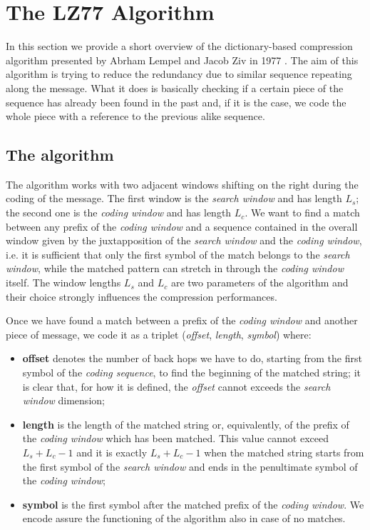 \section{The LZ77 Algorithm} \label{sec:lz77}
In this section we provide a short overview of the dictionary-based compression algorithm presented by Abrham Lempel and Jacob Ziv in 1977 \cite{ziv1}. The aim of this algorithm is trying to reduce the redundancy due to similar sequence repeating along the message. What it does is basically checking if a certain piece of the sequence has already been found in the past and, if it is the case, we code the whole piece with a reference to the previous alike sequence.

\subsection{The algorithm} \label{subsec:lz77alg}
The algorithm works with two adjacent windows shifting on the right during the coding of the message. The first window is the \textit{search window} and has length $L_s$; the second one is the \textit{coding window} and has length $L_c$. We want to find a match between any prefix of the \textit{coding window} and a sequence contained in the overall window given by the juxtapposition of the \textit{search window}
 and the \textit{coding window}, i.e. it is sufficient that only the first symbol of the match belongs to the \textit{search window}, while the matched pattern can stretch in through the \textit{coding window} itself. The window lengths $L_s$ and $L_c$ are two parameters of the algorithm and their choice strongly influences the compression performances.
 
Once we have found a match between a prefix of the \textit{coding window} and another piece of message, we code it as a triplet (\textit{offset}, \textit{length}, \textit{symbol}) where:
\begin{itemize}
\item
\textbf{offset} denotes the number of back hops we have to do, starting from the first symbol of the \textit{coding sequence}, to find the beginning of the matched string; it is clear that, for how it is defined, the \textit{offset} cannot exceeds the \textit{search window} dimension;

\item
\textbf{length} is the length of the matched string or, equivalently, of the prefix of the \textit{coding window} which has been matched. This value cannot exceed $L_s + L_c - 1$ and it is exactly $L_s + L_c - 1$ when the matched string starts from the first symbol of the \textit{search window} and ends in the penultimate symbol of the \textit{coding window};

\item
\textbf{symbol} is the first symbol after the matched prefix of the \textit{coding window}. We encode assure the functioning of the algorithm also in case of no matches. 
\end{itemize}

